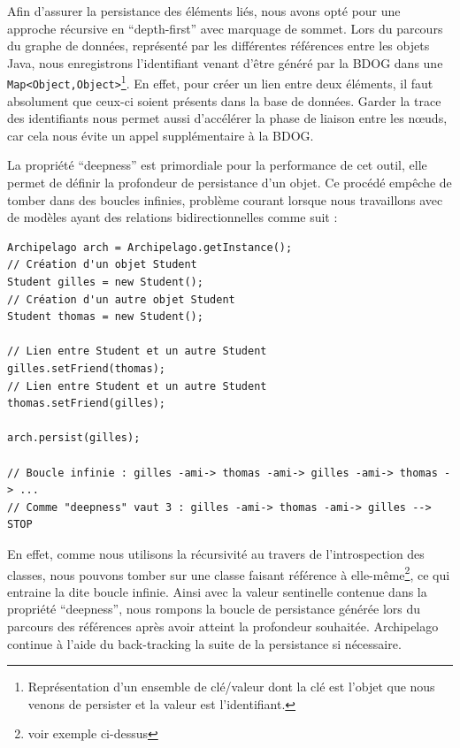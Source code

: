 \documentclass[a4paper,fleqn,12pt,oneside]{report}
\begin{document}
Afin d'assurer la persistance des éléments liés, nous avons opté pour une approche récursive en \enquote{depth-first} avec marquage de sommet. Lors du parcours du graphe de données, représenté par les différentes références entre les objets Java, nous enregistrons l'identifiant venant d'être généré par la BDOG dans une \texttt{Map<Object,Object>}\footnote{Représentation d'un ensemble de clé/valeur dont la clé est l'objet que nous venons de persister et la valeur est  l'identifiant.}. En effet, pour créer un lien entre deux éléments, il faut absolument que ceux-ci soient présents dans la base de données. Garder la trace des identifiants nous permet aussi d'accélérer la phase de liaison entre les nœuds, car cela nous évite un appel supplémentaire à la BDOG.

La propriété \enquote{deepness} est primordiale pour la performance de cet outil, elle permet de définir la profondeur de persistance d'un objet. Ce procédé empêche de tomber dans des boucles infinies, problème courant lorsque nous travaillons avec de modèles ayant des relations bidirectionnelles comme suit : 

\begin{lstlisting}
Archipelago arch = Archipelago.getInstance();
// Création d'un objet Student
Student gilles = new Student();
// Création d'un autre objet Student
Student thomas = new Student();

// Lien entre Student et un autre Student
gilles.setFriend(thomas);
// Lien entre Student et un autre Student
thomas.setFriend(gilles);

arch.persist(gilles);

// Boucle infinie : gilles -ami-> thomas -ami-> gilles -ami-> thomas -> ...
// Comme "deepness" vaut 3 : gilles -ami-> thomas -ami-> gilles --> STOP
\end{lstlisting}

En effet, comme nous utilisons la récursivité au travers de l'introspection des classes, nous pouvons tomber sur une classe faisant référence à elle-même\footnote{voir exemple ci-dessus}, ce qui entraine la dite boucle infinie. Ainsi avec la valeur sentinelle contenue dans la propriété \enquote{deepness}, nous rompons la boucle de persistance générée lors du parcours des références après avoir atteint la profondeur souhaitée. Archipelago continue à l'aide du back-tracking la suite de la persistance si nécessaire.
\end{document}
